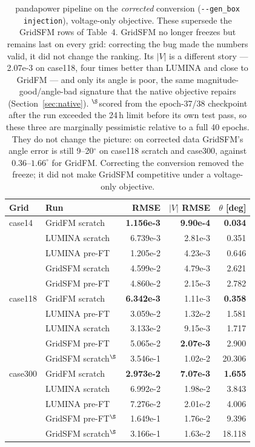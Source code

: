 \documentclass[10pt]{article}
\begin{document}
\begin{table}[H]
\centering
\small
\begin{tabular}{llrrr}
\toprule
Grid & Run & RMSE & \(|V|\) RMSE & \(\theta\) [deg] \\
\midrule
case14  & GridFM scratch  & \textbf{1.156e-3} & \textbf{9.90e-4} & \textbf{0.034} \\
        & LUMINA scratch  & 6.739e-3 & 2.81e-3 & 0.351 \\
        & LUMINA pre-FT   & 1.205e-2 & 4.23e-3 & 0.646 \\
        & GridSFM scratch & 4.599e-2 & 4.79e-3 & 2.621 \\
        & GridSFM pre-FT  & 4.860e-2 & 2.15e-3 & 2.782 \\
\midrule
case118 & GridFM scratch  & \textbf{6.342e-3} & 1.11e-3 & \textbf{0.358} \\
        & LUMINA pre-FT   & 3.059e-2 & 1.32e-2 & 1.581 \\
        & LUMINA scratch  & 3.133e-2 & 9.15e-3 & 1.717 \\
        & GridSFM pre-FT  & 5.065e-2 & \textbf{2.07e-3} & 2.900 \\
        & GridSFM scratch$^{\S}$ & 3.546e-1 & 1.02e-2 & 20.306 \\
\midrule
case300 & GridFM scratch  & \textbf{2.973e-2} & \textbf{7.07e-3} & \textbf{1.655} \\
        & LUMINA scratch  & 6.992e-2 & 1.98e-2 & 3.843 \\
        & LUMINA pre-FT   & 7.276e-2 & 2.01e-2 & 4.006 \\
        & GridSFM pre-FT$^{\S}$  & 1.649e-1 & 1.76e-2 & 9.396 \\
        & GridSFM scratch$^{\S}$ & 3.166e-1 & 1.63e-2 & 18.118 \\
\bottomrule
\end{tabular}
\caption{pandapower pipeline on the \emph{corrected} conversion
(\texttt{-{}-gen\_box injection}), voltage-only objective. These supersede the
GridSFM rows of Table~4. GridSFM no longer freezes but remains last on every
grid: correcting the bug made the numbers valid, it did not change the ranking.
Its \(|V|\) is a different story --- 2.07e-3 on case118, four times better than
LUMINA and close to GridFM --- and only its angle is poor, the same
magnitude-good/angle-bad signature that the native objective repairs
(Section~\ref{sec:native}). $^{\S}$scored from the epoch-37/38 checkpoint after
the run exceeded the 24\,h limit before its own test pass, so these three are
marginally pessimistic relative to a full 40 epochs. They do not change the
picture: on corrected data GridSFM's angle error is still 9--20\(^\circ\) on
case118 scratch and case300, against \(0.36\)--\(1.66^\circ\) for GridFM.
Correcting the conversion removed the freeze; it did not make GridSFM
competitive under a voltage-only objective.}
\end{table}
\end{document}
